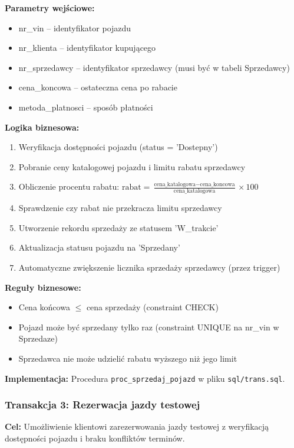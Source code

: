 \documentclass[a4paper,titleauthor]{mwart}
\begin{document}
	\textbf{Parametry wejściowe:}
	\begin{itemize}
		\item nr\_vin -- identyfikator pojazdu
		\item nr\_klienta -- identyfikator kupującego
		\item nr\_sprzedawcy -- identyfikator sprzedawcy (musi być w tabeli Sprzedawcy)
		\item cena\_koncowa -- ostateczna cena po rabacie
		\item metoda\_platnosci -- sposób płatności
	\end{itemize}

	\textbf{Logika biznesowa:}
	\begin{enumerate}
		\item Weryfikacja dostępności pojazdu (status = 'Dostepny')
		\item Pobranie ceny katalogowej pojazdu i limitu rabatu sprzedawcy
		\item Obliczenie procentu rabatu: $\text{rabat} = \frac{\text{cena\_katalogowa} - \text{cena\_koncowa}}{\text{cena\_katalogowa}} \times 100$
		\item Sprawdzenie czy rabat nie przekracza limitu sprzedawcy
		\item Utworzenie rekordu sprzedaży ze statusem 'W\_trakcie'
		\item Aktualizacja statusu pojazdu na 'Sprzedany'
		\item Automatyczne zwiększenie licznika sprzedaży sprzedawcy (przez trigger)
	\end{enumerate}

	\textbf{Reguły biznesowe:}
	\begin{itemize}
		\item Cena końcowa $\leq$ cena sprzedaży (constraint CHECK)
		\item Pojazd może być sprzedany tylko raz (constraint UNIQUE na nr\_vin w Sprzedaze)
		\item Sprzedawca nie może udzielić rabatu wyższego niż jego limit
	\end{itemize}

	\textbf{Implementacja:} Procedura \texttt{proc\_sprzedaj\_pojazd} w pliku \texttt{sql/trans.sql}.

	\subsubsection{Transakcja 3: Rezerwacja jazdy testowej}

	\textbf{Cel:} Umożliwienie klientowi zarezerwowania jazdy testowej z weryfikacją dostępności pojazdu i braku konfliktów terminów.
\end{document}
